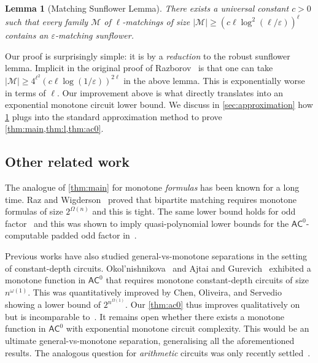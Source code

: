 \documentclass[11pt]{article}
\theoremstyle{plain}
\newtheorem{lemma}{Lemma}
\theoremstyle{definition}
\theoremstyle{remark}
\newcommand{\eps}{\varepsilon}
\newcommand{\complexityfont}[1]{\mathsf{#1}}
\def\AC           {\complexityfont{AC}}
\def\calm{{\mathcal M}}
\begin{document}
\begin{lemma}[Matching Sunflower Lemma]
    \label{lem:matching-sunflowers}
    \label{lem:sunflower-bound}
    There exists a universal constant $c>0$ such that every
    family $\calm$ of $\ell$-matchings of size $|\calm|\geq (c\ell\log^2 (\ell/\varepsilon))^\ell$ contains an $\eps$-matching sunflower.
\end{lemma}
Our proof is surprisingly simple: it is by a \emph{reduction} to the robust sunflower lemma. 
Implicit in the original proof of Razborov~\cite{Razborov1985} is that one
can take $|\calm|\geq 4^{\ell^2}(c \ell \log(1/\eps))^{2\ell}$ in the above
lemma. This is exponentially worse in terms of $\ell$. Our improvement
above is what directly translates into an exponential monotone circuit
lower bound. We discuss in \cref{sec:approximation} how
\cref{lem:matching-sunflowers} plugs into the standard approximation method
to prove \cref{thm:main,thm:l,thm:ac0}.

\subsection{Other related work}

The analogue of \cref{thm:main} for monotone \emph{formulas} has been known
for a long time. Raz and Wigderson~\cite{Raz1992} proved that bipartite
matching requires monotone formulas of size $2^{\Omega(n)}$ and this is
tight. The same lower bound holds for odd factor~\cite{Babai1999} and this
was shown to imply quasi-polynomial lower bounds for the $\AC^0$-computable
padded odd factor in~\cite{Cavalar2023}.

Previous works have also studied general-vs-monotone separations in the setting of constant-depth circuits.
Okol’nishnikova~\cite{Okolnishnikova1982} and Ajtai and
Gurevich~\cite{Ajtai1987} exhibited a monotone function in $\AC^0$ that
requires monotone constant-depth circuits of size $n^{\omega(1)}$. This was
quantitatively improved by Chen, Oliveira, and Servedio~\cite{Chen2017}
showing a lower bound of $2^{n^{\Omega(1)}}$. Our \cref{thm:ac0} thus
improves qualitatively on \cite{Okolnishnikova1982,Ajtai1987,Cavalar2023} but is
incomparable to~\cite{Chen2017}.
It remains open whether there exists a monotone function in $\AC^0$
with exponential monotone circuit complexity.
This would be an ultimate general-vs-monotone separation, generalising all the aforementioned results. The analogous question for \emph{arithmetic} circuits was only recently
settled~\cite{Chat21}.
\end{document}
